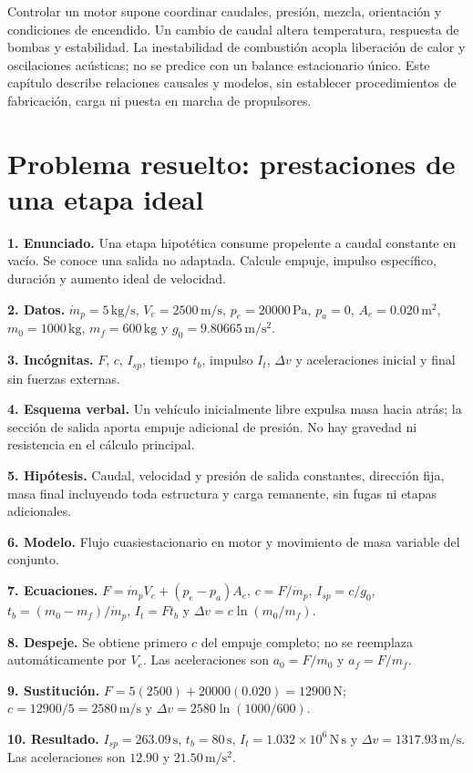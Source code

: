 Controlar un motor supone coordinar caudales, presión, mezcla, orientación y condiciones de encendido. Un cambio de caudal altera temperatura, respuesta de bombas y estabilidad. La inestabilidad de combustión acopla liberación de calor y oscilaciones acústicas; no se predice con un balance estacionario único. Este capítulo describe relaciones causales y modelos, sin establecer procedimientos de fabricación, carga ni puesta en marcha de propulsores.

\section{Problema resuelto: prestaciones de una etapa ideal}
\textbf{1. Enunciado.} Una etapa hipotética consume propelente a caudal constante en vacío. Se conoce una salida no adaptada. Calcule empuje, impulso específico, duración y aumento ideal de velocidad.

\textbf{2. Datos.} $\dot m_p=5\,\mathrm{kg/s}$, $V_e=2500\,\mathrm{m/s}$, $p_e=20000\,\mathrm{Pa}$, $p_a=0$, $A_e=0.020\,\mathrm{m^2}$, $m_0=1000\,\mathrm{kg}$, $m_f=600\,\mathrm{kg}$ y $g_0=9.80665\,\mathrm{m/s^2}$.

\textbf{3. Incógnitas.} $F$, $c$, $I_{sp}$, tiempo $t_b$, impulso $I_t$, $\Delta v$ y aceleraciones inicial y final sin fuerzas externas.

\textbf{4. Esquema verbal.} Un vehículo inicialmente libre expulsa masa hacia atrás; la sección de salida aporta empuje adicional de presión. No hay gravedad ni resistencia en el cálculo principal.

\textbf{5. Hipótesis.} Caudal, velocidad y presión de salida constantes, dirección fija, masa final incluyendo toda estructura y carga remanente, sin fugas ni etapas adicionales.

\textbf{6. Modelo.} Flujo cuasiestacionario en motor y movimiento de masa variable del conjunto.

\textbf{7. Ecuaciones.} $F=\dot m_pV_e+(p_e-p_a)A_e$, $c=F/\dot m_p$, $I_{sp}=c/g_0$, $t_b=(m_0-m_f)/\dot m_p$, $I_t=Ft_b$ y $\Delta v=c\ln(m_0/m_f)$.

\textbf{8. Despeje.} Se obtiene primero $c$ del empuje completo; no se reemplaza automáticamente por $V_e$. Las aceleraciones son $a_0=F/m_0$ y $a_f=F/m_f$.

\textbf{9. Sustitución.} $F=5(2500)+20000(0.020)=12900\,\mathrm{N}$; $c=12900/5=2580\,\mathrm{m/s}$ y $\Delta v=2580\ln(1000/600)$.

\textbf{10. Resultado.} $I_{sp}=263.09\,\mathrm{s}$, $t_b=80\,\mathrm{s}$, $I_t=1.032\times10^6\,\mathrm{N\,s}$ y $\Delta v=1317.93\,\mathrm{m/s}$. Las aceleraciones son $12.90$ y $21.50\,\mathrm{m/s^2}$.

